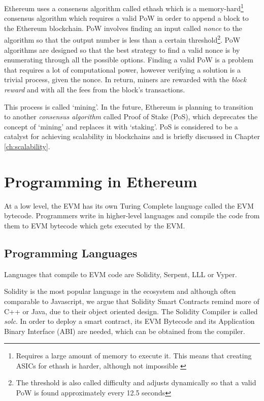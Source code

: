 Ethereum uses a consensus algorithm called ethash\cite{ethash} which is a memory-hard\footnote{Requires a large amount of memory to execute it. This means that creating ASICs for ethash is harder, although not impossible \cite{asicfork}} consensus algorithm which requires a valid PoW in order to append a block to the Ethereum blockchain. PoW involves finding an input called \textit{nonce} to the algorithm so that the output number is less than a certain threshold\footnote{The threshold is also called difficulty and adjusts dynamically so that a valid PoW is found approximately every 12.5 seconds}. PoW algorithms are designed so that the best strategy to find a valid nonce is by enumerating through all the possible options. Finding a valid PoW is a problem that requires a lot of computational power, however verifying a solution is a trivial process, given the nonce. In return, miners are rewarded with the \textit{block reward} and with all the fees from the block's transactions.

This process is called `mining'. In the future, Ethereum is planning to transition to another \textit{consensus algorithm} called Proof of Stake (PoS), which deprecates the concept of `mining' and replaces it with `staking'. PoS is considered to be a catalyst for achieving scalability in blockchains and is briefly discussed in Chapter \ref{ch:scalability}.


\section{Programming in Ethereum}
At a low level, the EVM has its own Turing Complete language called the EVM bytecode. Programmers write in higher-level languages and compile the code from them to EVM bytecode which gets executed by the EVM\@.

\subsection{Programming Languages}
Languages that compile to EVM code are Solidity, Serpent, LLL or Vyper. 

Solidity is the most popular language in the ecosystem and although often comparable to Javascript, we argue that Solidity Smart Contracts remind more of C++ or Java, due to their object oriented design. The Solidity Compiler is called \textit{solc}. In order to deploy a smart contract, its EVM Bytecode and its Application Binary Interface (ABI) are needed, which can be obtained from the compiler.

